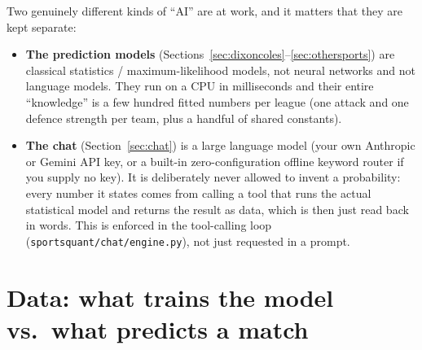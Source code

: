 \documentclass[11pt]{article}
\begin{document}
Two genuinely different kinds of ``AI'' are at work, and it matters that they are kept separate:

\begin{itemize}
\item \textbf{The prediction models} (Sections~\ref{sec:dixoncoles}--\ref{sec:othersports}) are
classical statistics / maximum-likelihood models, not neural networks and not language models.
They run on a CPU in milliseconds and their entire ``knowledge'' is a few hundred fitted numbers
per league (one attack and one defence strength per team, plus a handful of shared constants).
\item \textbf{The chat} (Section~\ref{sec:chat}) is a large language model (your own Anthropic or
Gemini API key, or a built-in zero-configuration offline keyword router if you supply no key). It
is deliberately never allowed to invent a probability: every number it states comes from calling a
tool that runs the actual statistical model and returns the result as data, which is then just
read back in words. This is enforced in the tool-calling loop
(\texttt{sportsquant/chat/engine.py}), not just requested in a prompt.
\end{itemize}

\section{Data: what trains the model vs.\ what predicts a match}
\end{document}
